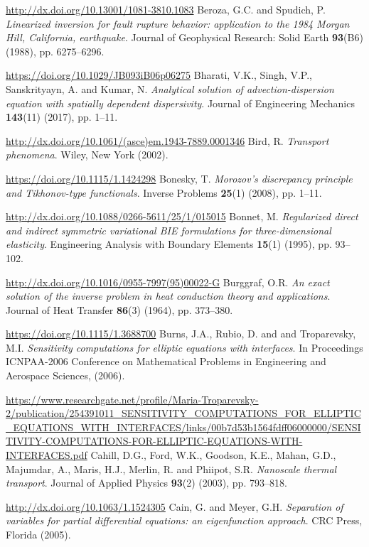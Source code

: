 \begin{thebibliography}{301}
\url{http://dx.doi.org/10.13001/1081-3810.1083}
%
%
 Beroza, G.C. and Spudich, P. {\it Linearized inversion for fault rupture behavior: application to the 1984 Morgan Hill, California, earthquake}. Journal of Geophysical Research: Solid Earth {\bf 93}(B6) (1988), pp. 6275--6296.

\url{https://doi.org/10.1029/JB093iB06p06275}
%
%
 Bharati, V.K., Singh, V.P., Sanskrityayn, A. and Kumar, N. {\it Analytical solution of advection-dispersion equation with spatially dependent dispersivity}. Journal of Engineering Mechanics {\bf 143}(11) (2017), pp. 1--11.

\url{http://dx.doi.org/10.1061/(asce)em.1943-7889.0001346}
%
%
 Bird, R. {\it Transport phenomena}. Wiley, New York (2002).

\url{https://doi.org/10.1115/1.1424298}
%
%
 Bonesky, T. {\it Morozov's discrepancy principle and Tikhonov-type functionals}. Inverse Problems {\bf 25}(1) (2008), pp. 1--11.

\url{http://dx.doi.org/10.1088/0266-5611/25/1/015015}
%
%
 Bonnet, M. {\it Regularized direct and indirect symmetric variational BIE formulations for three-dimensional elasticity}. Engineering Analysis with Boundary Elements {\bf 15}(1) (1995), pp. 93--102. 

\url{http://dx.doi.org/10.1016/0955-7997(95)00022-G}
%
%
 Burggraf, O.R. {\it An exact solution of the inverse problem in heat conduction theory and applications}. Journal of Heat Transfer {\bf 86}(3) (1964), pp. 373--380. 

\url{https://doi.org/10.1115/1.3688700}
%
%
 Burns, J.A., Rubio, D. and and Troparevsky, M.I. {\it Sensitivity computations for elliptic equations with interfaces}. In Proceedings ICNPAA-2006 Conference on Mathematical Problems in Engineering and Aerospace Sciences, (2006).

\url{https://www.researchgate.net/profile/Maria-Troparevsky-2/publication/254391011_SENSITIVITY_COMPUTATIONS_FOR_ELLIPTIC_EQUATIONS_WITH_INTERFACES/links/00b7d53b1564fdff06000000/SENSITIVITY-COMPUTATIONS-FOR-ELLIPTIC-EQUATIONS-WITH-INTERFACES.pdf}
%
%
 Cahill, D.G., Ford, W.K., Goodson, K.E., Mahan, G.D., Majumdar, A., Maris, H.J., Merlin, R. and Phiipot, S.R. {\it Nanoscale thermal transport}. Journal of Applied Physics {\bf 93}(2) (2003), pp. 793--818. 

\url{http://dx.doi.org/10.1063/1.1524305}
%
 Cain, G. and Meyer, G.H. {\it Separation of variables for partial differential equations: an eigenfunction approach}. CRC Press, Florida (2005). 


\end{thebibliography}
